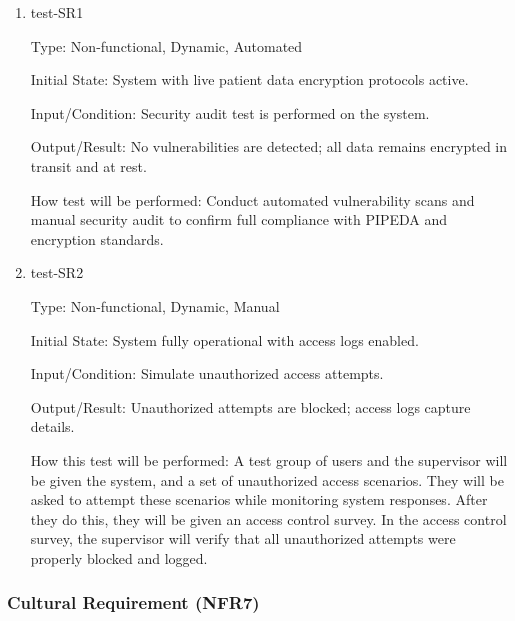 \documentclass[12pt, titlepage]{article}
\begin{document}
\begin{enumerate}
    \item{test-SR1} \label{test-SR1}
    
    Type: Non-functional, Dynamic, Automated
    
    Initial State: System with live patient data encryption protocols active.
    
    Input/Condition: Security audit test is performed on the system.
    
    Output/Result: No vulnerabilities are detected; all data remains encrypted in transit and at rest.
    
    How test will be performed: Conduct automated vulnerability scans and manual security audit to confirm full compliance with PIPEDA and encryption standards.

    \item{test-SR2} \label{test-SR2}
    
    Type: Non-functional, Dynamic, Manual
    
    Initial State: System fully operational with access logs enabled.
    
    Input/Condition: Simulate unauthorized access attempts.
    
    Output/Result: Unauthorized attempts are blocked; access logs capture details.
    
    How this test will be performed: A test group of users and the supervisor will be given the system, and a set of unauthorized access scenarios. They will be asked to attempt these scenarios while monitoring system responses. After they do this, they will be given an access control survey. In the access control survey, the supervisor will verify that all unauthorized attempts were properly blocked and logged.
\end{enumerate}

\subsubsection{Cultural Requirement (NFR7)} \label{section:4.2.7}
\end{document}
